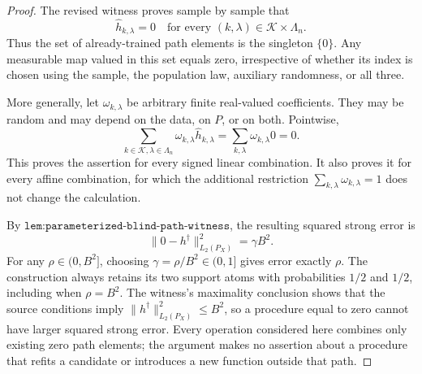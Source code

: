 \begin{proof}
The revised witness proves sample by sample that
\[
 \widehat h_{k,\lambda}=0
 \quad\text{for every }(k,\lambda)\in\mathcal K\times\Lambda_n.
\]
Thus the set of already-trained path elements is the singleton \(\{0\}\). Any measurable map valued in this set equals zero, irrespective of whether its index is chosen using the sample, the population law, auxiliary randomness, or all three.

More generally, let \(\omega_{k,\lambda}\) be arbitrary finite real-valued coefficients. They may be random and may depend on the data, on \(P\), or on both. Pointwise,
\[
 \sum_{k\in\mathcal K,\lambda\in\Lambda_n}
 \omega_{k,\lambda}\widehat h_{k,\lambda}
 =\sum_{k,\lambda}\omega_{k,\lambda}0
 =0.
\]
This proves the assertion for every signed linear combination. It also proves it for every affine combination, for which the additional restriction \(\sum_{k,\lambda}\omega_{k,\lambda}=1\) does not change the calculation.

By \(\texttt{lem:parameterized-blind-path-witness}\), the resulting squared strong error is
\[
 \|0-h^\dagger\|_{L_2(P_X)}^2=\gamma B^2.
\]
For any \(\rho\in(0,B^2]\), choosing \(\gamma=\rho/B^2\in(0,1]\) gives error exactly \(\rho\). The construction always retains its two support atoms with probabilities \(1/2\) and \(1/2\), including when \(\rho=B^2\). The witness's maximality conclusion shows that the source conditions imply \(\|h^\dagger\|_{L_2(P_X)}^2\le B^2\), so a procedure equal to zero cannot have larger squared strong error. Every operation considered here combines only existing zero path elements; the argument makes no assertion about a procedure that refits a candidate or introduces a new function outside that path.
\end{proof}